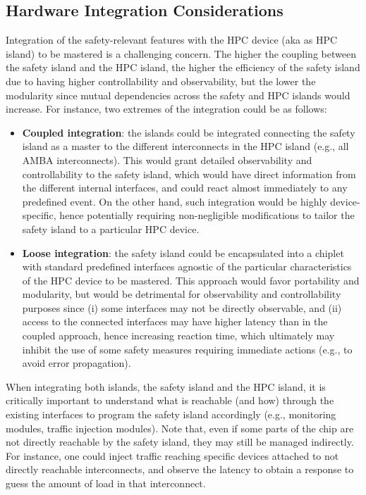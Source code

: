\subsection{Hardware Integration Considerations}


Integration of the safety-relevant features with the HPC device (aka as HPC island) to be mastered is a challenging concern. The higher the coupling between the safety island and the HPC island, the higher the efficiency of the safety island due to having higher controllability and observability, but the lower the modularity since mutual dependencies across the safety and HPC islands would increase. For instance, two extremes of the integration could be as follows:
\begin{itemize}
\item \textbf{Coupled integration}: the islands could be integrated connecting the safety island as a master to the different interconnects in the HPC island (e.g., all AMBA interconnects). This would grant detailed observability and controllability to the safety island, which would have direct information from the different internal interfaces, and could react almost immediately to any predefined event.
On the other hand, such integration would be highly device-specific, hence potentially requiring non-negligible modifications to tailor the safety island to a particular HPC device.
\item \textbf{Loose integration}: the safety island could be encapsulated into a chiplet with standard predefined interfaces agnostic of the particular characteristics of the HPC device to be mastered. This approach would favor portability and modularity, but would be detrimental for observability and controllability purposes since (i) some interfaces may not be directly observable, and (ii) access to the connected interfaces may have higher latency than in the coupled approach, hence increasing reaction time, which ultimately may inhibit the use of some safety measures requiring immediate actions (e.g., to avoid error propagation).
\end{itemize}

When integrating both islands, the safety island and the HPC island, it is critically important to understand what is reachable (and how) through the existing interfaces to program the safety island accordingly (e.g., monitoring modules, traffic injection modules). Note that, even if some parts of the chip are not directly reachable by the safety island, they may still be managed indirectly. For instance, one could inject traffic reaching specific devices attached to not directly reachable interconnects, and observe the latency to obtain a response to guess the amount of load in that interconnect.

